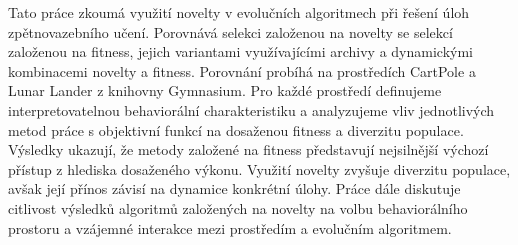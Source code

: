\documentclass[12pt]{report}
\begin{document}

Tato práce zkoumá využití novelty v evolučních algoritmech při řešení úloh zpětnovazebního učení. Porovnává selekci založenou na novelty se selekcí založenou na fitness, jejich variantami využívajícími archivy a dynamickými kombinacemi novelty a fitness. Porovnání probíhá na prostředích CartPole a Lunar Lander z knihovny Gymnasium. Pro každé prostředí definujeme interpretovatelnou behaviorální charakteristiku a analyzujeme vliv jednotlivých metod práce s objektivní funkcí na dosaženou fitness a diverzitu populace.
Výsledky ukazují, že metody založené na fitness představují nejsilnější výchozí přístup z hlediska dosaženého výkonu. Využití novelty zvyšuje diverzitu populace, avšak její přínos závisí na dynamice konkrétní úlohy.
Práce dále diskutuje citlivost výsledků algoritmů založených na novelty na volbu behaviorálního prostoru a vzájemné interakce mezi prostředím a evolučním algoritmem.
\end{document}
